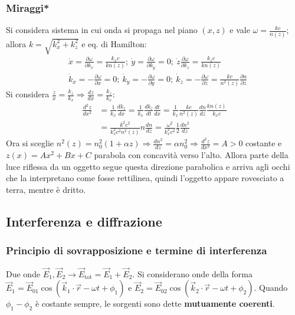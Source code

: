 \documentclass[a4paper]{scrartcl}
\numberwithin{equation}{subsection}
\theoremstyle{style1}
\begin{document}
\subsubsection{Miraggi*}

Si considera sistema in cui onda si propaga nel piano $(x,z)$ e vale $\omega = \frac{k c}{n(z)}$; allora $k=\sqrt{k_x^2 + k_z^2} $ e eq. di Hamilton:
\begin{equation}
	\begin{split}
		&\dot{x}= \frac{\partial \omega}{\partial k_x} = \frac{k_x c }{k n(z)}; \ \dot{y}= \frac{\partial \omega}{\partial k_y} =0; \ \dot{z } \frac{\partial \omega}{\partial k_z} = \frac{k_z c}{k n(z)}\\
		&\dot{k}_x = - \frac{\partial \omega}{\partial x} = 0; \ \dot{k}_y = - \frac{\partial \omega}{\partial y} =0; \ \dot{k}_z= -\frac{\partial \omega}{\partial z} = \frac{kc}{n^2 (z)}\frac{\partial n}{\partial z} 
	\end{split}
\end{equation}
Si considera $\frac{\dot{z}}{\dot{x}} = \frac{k_z}{k_x}\Rightarrow \frac{d z}{d x} = \frac{k_z}{k_x}$:
\[
\begin{split}
	\frac{d ^2 z}{d x^2} &= \frac{1}{k_x} \frac{d k_z}{d x} =\frac{1}{k_x}\frac{d k_z}{d t} \frac{d t}{d x} = \frac{1}{k_x}\frac{kc}{n^2(z)}\frac{d n}{d z} \frac{kn(z)}{k_x c} \\
			     &= \frac{k^2 c^2}{k_x^2 c^2 n^2(z)} n\frac{d n}{d z} = \frac{\omega^2}{k_x^2 c^2} \frac{1}{2}\frac{d n^2}{d z} 
\end{split}
\] 
Ora si sceglie $n^2(z) = n_0^2 (1+\alpha z)\Rightarrow \frac{d n^2}{d z} = \alpha n_0^2 \Rightarrow \frac{d ^2z}{d x^2} =A>0$ costante e $z(x) = Ax^2 + Bx + C$ parabola con concavit\`a verso l'alto. Allora parte della luce riflessa da un oggetto segue questa direzione parabolica e arriva agli occhi che la interpretano come fosse rettilinea, quindi l'oggetto appare rovesciato a terra, mentre \`e dritto.
\subsection{Interferenza e diffrazione}

\subsubsection{Principio di sovrapposizione e termine di interferenza}

Due onde $\vec{E}_1, \vec{E}_2\to \vec{E}_\text{tot} = \vec{E}_1 + \vec{E}_2$. Si considerano onde della forma $\vec{E}_1 = \vec{E}_{01} \cos(\vec{k}_1\cdot \vec{r}-\omega t+ \phi _1)$ e $\vec{E}_2 = \vec{E}_{02} \cos(\vec{k}_2 \cdot \vec{r}-\omega t + \phi _2)$. Quando $\phi _1 - \phi _2$ \`e costante sempre, le sorgenti sono dette \textbf{mutuamente coerenti}.
\end{document}
